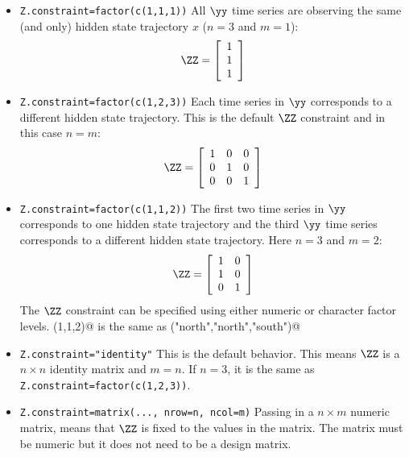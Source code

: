 \begin{itemize}\itemsep5pt
\item[] \texttt{Z.constraint=factor(c(1,1,1))}  All $\yy$ time series are observing the same (and only) hidden state trajectory $x$ ($n=3$ and $m=1$):
\begin{equation*}
 \ZZ =
 \left[ \begin{array}{c}
    1  \\
    1  \\
    1  
    \end{array} \right]  
\end{equation*}

\item[] \texttt{Z.constraint=factor(c(1,2,3))}  Each time series in $\yy$ corresponds to a different hidden state trajectory.  This is the default $\ZZ$ constraint and in this case $n=m$:
\begin{equation*}
 \ZZ =
  \left[ \begin{array}{ccc}
    1 & 0 & 0 \\
    0 & 1 & 0 \\
    0 & 0 & 1 \end{array} \right]
\end{equation*}

\item[] \texttt{Z.constraint=factor(c(1,1,2))} The first two time series in $\yy$ corresponds to one hidden state trajectory and the third $\yy$ time series corresponds to a different hidden state trajectory.  Here $n=3$ and $m=2$:
\begin{equation*}
 \ZZ =
  \left[ \begin{array}{cc}
    1 & 0  \\
    1 & 0  \\
    0 & 1  \end{array} \right]
\end{equation*}
The $\ZZ$ constraint can be specified using either numeric or character factor levels.  \verb@c(1,1,2)@ is the same as \verb@c("north","north","south")@

\item[] \texttt{Z.constraint="identity"} This is the default behavior.  This means $\ZZ$ is a $n \times n$ identity matrix and $m=n$.  If $n=3$, it is the same as \texttt{Z.constraint=factor(c(1,2,3))}.

\item[] \texttt{Z.constraint=matrix(..., nrow=n, ncol=m)}  Passing in a $n \times m$ numeric matrix, means that $\ZZ$ is fixed to the values in the matrix. The matrix must be numeric but it does not need to be a design matrix.

\end{itemize}

